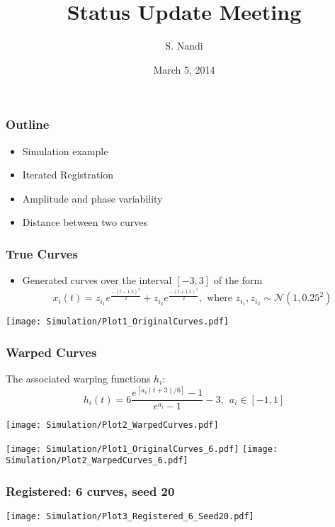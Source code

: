 \documentclass[10pt,dvipsnames,table]{beamer}
\title[Status Update Mar '15]{Status Update Meeting}
\author{S. Nandi}
\institute[LMCG]{LMCG \\
 University of Wisconsin-Madison}
\date{March 5, 2014}
\begin{document}
\setlength{\baselineskip}{16truept}
\frame{\maketitle}

\begin{frame}
\frametitle{Outline}
\begin{itemize}
\item Simulation example
\item Iterated Registration
\item Amplitude and phase variability
\item Distance between two curves
\end{itemize}
\end{frame}

\begin{frame}
\frametitle{True Curves}
\begin{itemize}
\item Generated curves over the interval $[-3,3]$ of the form
\[ x_i(t) = z_{i_1} e^{\frac{-(t - 1.5)^2}{2}} + z_{i_2} e^{\frac{-(t + 1.5)^2}{2}}, \text{\ \ where \ } z_{i_1}, z_{i_2} \sim \mathcal{N}(1, 0.25^2) \]
\end{itemize}
\begin{center}
\texttt{[image: Simulation/Plot1\_OriginalCurves.pdf]} 
\end{center}
\end{frame}

\begin{frame}
\frametitle{Warped Curves}
The associated warping functions $h_i$:
\[ h_i(t) = 6 \frac{e^{[a_i(t+3)/6]} - 1}{e^{a_i} - 1} - 3 ,\ \ a_i \in [-1,1]\]
\begin{center}
\texttt{[image: Simulation/Plot2\_WarpedCurves.pdf]} 
\end{center}
\end{frame}

\begin{frame}
\begin{center}
\texttt{[image: Simulation/Plot1\_OriginalCurves\_6.pdf]} 
\texttt{[image: Simulation/Plot2\_WarpedCurves\_6.pdf]} 
\end{center}
\end{frame}

\begin{frame}
\frametitle{Registered: 6 curves, seed 20}
\begin{center}
\texttt{[image: Simulation/Plot3\_Registered\_6\_Seed20.pdf]} 
\end{center}
\end{frame}
\end{document}
